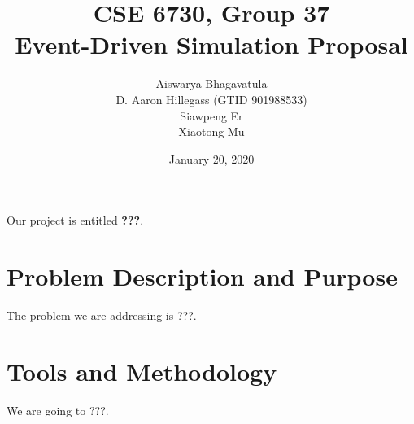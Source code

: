 \documentclass[12pt]{article}
\begin{document}
\title{CSE 6730, Group 37 \\
Event-Driven Simulation Proposal}
\author{
Aiswarya Bhagavatula  \\
D. Aaron Hillegass (GTID 901988533) \\
Siawpeng Er \\
Xiaotong Mu 
}

\date{January 20, 2020}
\maketitle

Our project is entitled \textbf{???}.

\section{Problem Description and Purpose}

The problem we are addressing is ???.

\section{Tools and Methodology}

We are going to ???.
\end{document}
